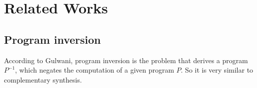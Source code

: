 \documentclass[journal]{IEEEtran}
\begin{document}
%

\section{Related Works}\label{sec_relwork}

%

\subsection{Program inversion}\label{subsec_proinv}
According to Gulwani\cite{dim_syn},
program inversion is the problem that derives a program $P^{-1}$,
which negates the computation of a given program $P$.
So it is very similar to complementary synthesis.
\end{document}
